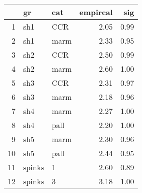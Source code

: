 \begin{table}[ht]
\centering
\begin{tabular}{rllrr}
  \hline
 & gr & cat & empircal & sig \\ 
  \hline
1 & sh1 & CCR & 2.05 & 0.99 \\ 
  2 & sh1 & marm & 2.33 & 0.95 \\ 
  3 & sh2 & CCR & 2.50 & 0.99 \\ 
  4 & sh2 & marm & 2.60 & 1.00 \\ 
  5 & sh3 & CCR & 2.31 & 0.97 \\ 
  6 & sh3 & marm & 2.18 & 0.96 \\ 
  7 & sh4 & marm & 2.27 & 1.00 \\ 
  8 & sh4 & pall & 2.20 & 1.00 \\ 
  9 & sh5 & marm & 2.30 & 0.96 \\ 
  10 & sh5 & pall & 2.44 & 0.95 \\ 
  11 & spinks & 1 & 2.60 & 0.89 \\ 
  12 & spinks & 3 & 3.18 & 1.00 \\ 
   \hline
\end{tabular}
\label{llmiss}
\end{table}
